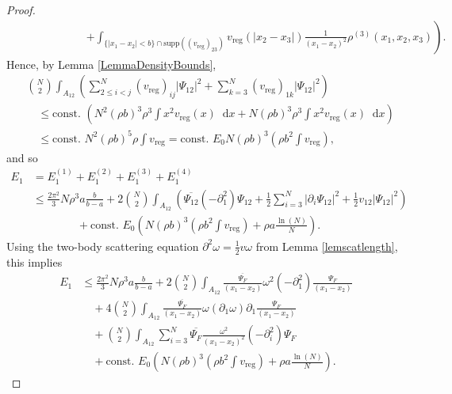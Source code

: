\documentclass[a4paper,11pt]{article}
\newcommand{\supp}{\text{supp}}
\newcommand{\abs}[1]{\left\lvert #1 \right\rvert}
\newcommand*\diff{\mathop{}\!\mathrm{d}}
\numberwithin{equation}{section}
\begin{document}
\begin{proof}
\begin{equation}
\begin{aligned}
				&\qquad\qquad\qquad\left.+\int_{\{\abs{x_1-x_2}<b\}\cap\supp((v_{\text{reg}})_{23})}v_{\text{reg}}(\abs{x_2-x_3})\frac{1}{(x_1-x_2)^2}\rho^{(3)}(x_1,x_2,x_3)\right).
			\end{aligned}
		\end{equation}
		Hence, by Lemma \ref{LemmaDensityBounds}, 
		\begin{equation}
			\begin{aligned}
				&\binom{N}{2}\int_{A_{12}} \left(\sum_{2\leq i<j}^{N}(v_{\text{reg}})_{ij}\abs{\Psi_{12}}^2+\sum_{k=3}^{N}(v_{\text{reg}})_{1k}\abs{\Psi_{12}}^2\right)\\&\quad\leq \text{const. } \left(N^2(\rho b)^3\rho^3\int x^2 v_{\text{reg}}(x)\diff x+N(\rho b)^3 \rho^3 \int x^2 v_{\text{reg}}(x)\diff x\right)\\
				&\quad \leq \text{const. } N^2(\rho b)^5\rho \int v_{\text{reg}}=\text{const. }E_0 N (\rho b)^3 \left(\rho b^2\int v_{\text{reg}}\right),
			\end{aligned}
		\end{equation}
		and so \begin{equation}
			\begin{aligned}
				E_1&=E_1^{(1)}+E_1^{(2)}+E_1^{(3)}+E_1^{(4)}\\&\leq \frac{2\pi^2}{3}N\rho^3 a\frac{b}{b-a}+2\binom{N}{2}\int_{A_{12}}\left(\overline{\Psi_{12}}(-\partial^2_1)\Psi_{12}+\frac{1}{2}\sum_{i=3}^{N}\abs{\partial_i\Psi_{12}}^2+\frac{1}{2}v_{12}\abs{\Psi_{12}}^2\right)\\&\qquad \qquad +\text{const. } E_0\left(N(\rho b)^3\left(\rho b^2 \int v_{\text{reg}}\right)+\rho a\frac{\ln(N)}{N}\right).
			\end{aligned}
		\end{equation}
		Using the two-body scattering equation $ \partial^2\omega=\frac{1}{2}v\omega$ from Lemma \ref{lemscatlength}, this implies \begin{equation}
			\label{someest}
			\begin{aligned}
				E_1&\leq \frac{2\pi^2}{3}N\rho^3 a\frac{b}{b-a}+2\binom{N}{2}\int_{A_{12}}\frac{\overline{\Psi_F}}{(x_1-x_2)}\omega^2(-\partial^2_1)\frac{\Psi_F}{(x_1-x_2)}\\&\quad+4\binom{N}{2}\int_{A_{12}}\frac{\overline{\Psi_F}}{(x_1-x_2)}\omega(\partial_1\omega)\partial_1\frac{\Psi_F}{(x_1-x_2)}\\
				&\quad +\binom{N}{2}\int_{A_{12}}\sum_{i=3}^{N} \overline{\Psi_F}\frac{\omega^2}{(x_1-x_2)^2}(-\partial^2_i)\Psi_F
				\\&\quad+\text{const. } E_0\left(N(\rho b)^3\left(\rho b^2 \int v_{\text{reg}}\right)+\rho a\frac{\ln(N)}{N}\right).

\end{aligned}
\end{equation}
\end{proof}
\end{document}
